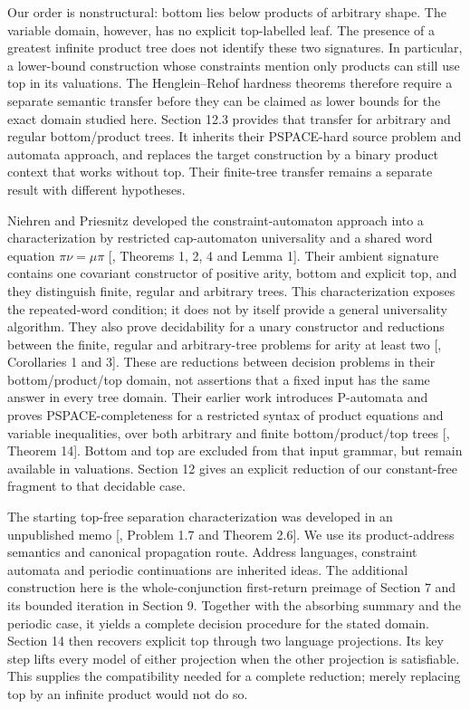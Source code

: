\documentclass[
  11pt,
  a4paper,
]{article}
\begin{document}
Our order is nonstructural: bottom lies below products of arbitrary
shape. The variable domain, however, has no explicit top-labelled leaf.
The presence of a greatest infinite product tree does not identify these
two signatures. In particular, a lower-bound construction whose
constraints mention only products can still use top in its valuations.
The Henglein--Rehof hardness theorems therefore require a separate
semantic transfer before they can be claimed as lower bounds for the
exact domain studied here. Section 12.3 provides that transfer for
arbitrary and regular bottom/product trees. It inherits their
PSPACE-hard source problem and automata approach, and replaces the
target construction by a binary product context that works without top.
Their finite-tree transfer remains a separate result with different
hypotheses.

Niehren and Priesnitz developed the constraint-automaton approach into a
characterization by restricted cap-automaton universality and a shared
word equation \(\pi\nu=\mu\pi\) {[}, Theorems 1,
2, 4 and Lemma 1{]}. Their ambient signature contains one covariant
constructor of positive arity, bottom and explicit top, and they
distinguish finite, regular and arbitrary trees. This characterization
exposes the repeated-word condition; it does not by itself provide a
general universality algorithm. They also prove decidability for a unary
constructor and reductions between the finite, regular and
arbitrary-tree problems for arity at least two
{[}, Corollaries 1 and 3{]}. These are reductions
between decision problems in their bottom/product/top domain, not
assertions that a fixed input has the same answer in every tree domain.
Their earlier work introduces P-automata and proves PSPACE-completeness
for a restricted syntax of product equations and variable inequalities,
over both arbitrary and finite bottom/product/top trees
{[}, Theorem 14{]}. Bottom and top are excluded
from that input grammar, but remain available in valuations. Section 12
gives an explicit reduction of our constant-free fragment to that
decidable case.

The starting top-free separation characterization was developed in an
unpublished memo {[}, Problem 1.7 and Theorem
2.6{]}. We use its product-address semantics and canonical propagation
route. Address languages, constraint automata and periodic continuations
are inherited ideas. The additional construction here is the
whole-conjunction first-return preimage of Section 7 and its bounded
iteration in Section 9. Together with the absorbing summary and the
periodic case, it yields a complete decision procedure for the stated
domain. Section 14 then recovers explicit top through two language
projections. Its key step lifts every model of either projection when
the other projection is satisfiable. This supplies the compatibility
needed for a complete reduction; merely replacing top by an infinite
product would not do so.
\end{document}
